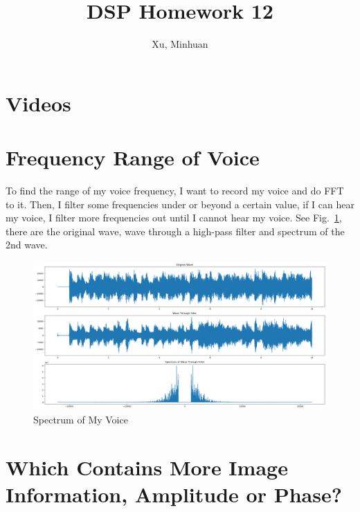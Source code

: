 \documentclass{article}
\begin{document}
\title{DSP Homework 12}
\author{Xu, Minhuan}
\maketitle
\tableofcontents
\begin{abstract}

\end{abstract}

\section{Videos}

\section{Frequency Range of Voice}
To find the range of my voice frequency, I want to record my voice and do FFT to it. Then, I filter some frequencies under or beyond a certain value, if I can hear my voice, I filter more frequencies out until I cannot hear my voice. See Fig.~\ref{fig:voiceSpectrum}, there are the original wave, wave through a high-pass filter and spectrum of the 2nd wave.

\begin{figure}[!h]
	\centering
	\includegraphics[width=6 in]{../pic/voiceSpectrum.png}
	\caption{Spectrum of My Voice}
	\label{fig:voiceSpectrum}
\end{figure}
\section{Which Contains More Image Information, Amplitude or Phase?}




\end{document}
